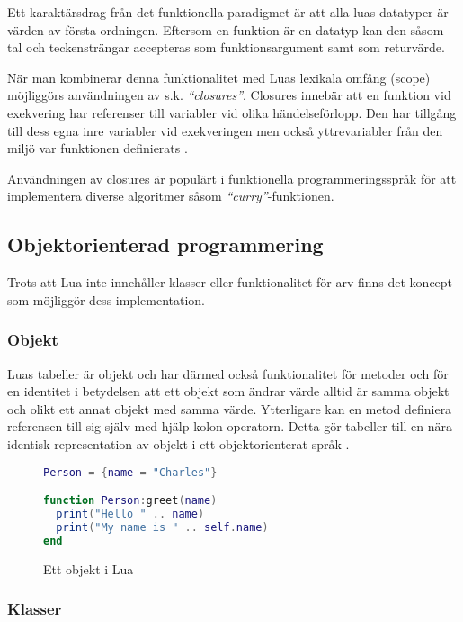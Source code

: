 Ett karaktärsdrag från det funktionella paradigmet är att alla luas datatyper
är värden av första ordningen. Eftersom en funktion är en datatyp kan den såsom
tal och teckensträngar accepteras som funktionsargument samt som returvärde.

När man kombinerar denna funktionalitet med Luas lexikala omfång (scope)
möjliggörs användningen av s.k. \textit{``closures''}. Closures innebär att
en funktion vid exekvering har referenser till variabler vid olika
händelseförlopp. Den har tillgång till dess egna inre variabler vid
exekveringen men också yttrevariabler från den miljö var funktionen
definierats \citep[s. 45]{ir06}.

Användningen av closures är populärt i funktionella programmeringsspråk för
att implementera diverse algoritmer såsom \textit{``curry''}-funktionen.

\subsection{Objektorienterad programmering}

Trots att Lua inte innehåller klasser eller funktionalitet för arv finns det
koncept som möjliggör dess implementation.

\subsubsection{Objekt}

Luas tabeller är objekt och har därmed också funktionalitet för metoder och
för en identitet i betydelsen att ett objekt som ändrar värde alltid är samma
objekt och olikt ett annat objekt med samma värde. Ytterligare kan en metod
definiera referensen till sig själv med hjälp kolon operatorn. Detta gör
tabeller till en nära identisk representation av objekt i ett objektorienterat
språk \citep[s. 149]{ir06}.

\begin{figure}[ht]
  \begin{lstlisting}[language=Lua]
Person = {name = "Charles"}

function Person:greet(name)
  print("Hello " .. name)
  print("My name is " .. self.name)
end
  \end{lstlisting}
  \caption{Ett objekt i Lua}
\end{figure}

\subsubsection{Klasser}

